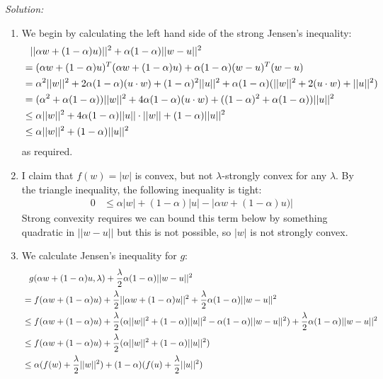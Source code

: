 \documentclass[
10pt, %
a4paper, %
oneside, %
headinclude,footinclude, %
BCOR5mm, %
]{scrartcl}
\newenvironment{solution}
               {\textit{Solution:}}
               {}
\begin{document}
\begin{solution}
  \begin{enumerate}[label=(\alph*)]
      \item We begin by calculating the left hand side of the strong Jensen's inequality:
        \begin{align*}
        &\hphantom{=} ||\alpha w + (1-\alpha)u)||^2 + \alpha(1-\alpha)||w-u||^2 \\
        &= (\alpha w + (1-\alpha)u)^T(\alpha w + (1-\alpha)u) + \alpha(1-\alpha)(w-u)^T(w-u) \\
        &= \alpha^2||w||^2 + 2\alpha(1-\alpha)(u\cdot w) + (1-\alpha)^2||u||^2 + \alpha(1-\alpha)(||w||^2 + 2(u\cdot w) + ||u||^2) \\
        &= (\alpha^2+\alpha(1-\alpha))||w||^2 + 4\alpha(1-\alpha)(u\cdot w) + ((1-\alpha)^2 + \alpha(1-\alpha))||u||^2 \\
        &\leq \alpha||w||^2 + 4\alpha(1-\alpha)||u||\cdot ||w|| + (1-\alpha)||u||^2 \\
        &\leq \alpha||w||^2 + (1-\alpha)||u||^2
        \end{align*}
        as required.
      \item I claim that $f(w)=|w|$ is convex, but not $\lambda$-strongly convex for any $\lambda$. By the triangle inequality, the following inequality is tight:
        \begin{align*}
          0 &\leq \alpha|w| + (1-\alpha)|u| -|\alpha w + (1-\alpha)u)|
        \end{align*}
        Strong convexity requires we can bound this term below by something quadratic in $||w-u||$ but this is not possible, so $|w|$ is not strongly convex.
      \item We calculate Jensen's inequality for $g$: \begin{align*}
        &\hphantom{=} g(\alpha w + (1-\alpha)u, \lambda) + \frac{\lambda}{2}\alpha(1-\alpha)||w-u||^2 \\
        &= f(\alpha w + (1-\alpha)u) + \frac{\lambda}{2}||\alpha w + (1-\alpha) u||^2 + \frac{\lambda}{2}\alpha(1-\alpha)||w-u||^2 \\
        &\leq f(\alpha w + (1-\alpha)u) + \frac{\lambda}{2}(\alpha||w||^2 + (1-\alpha)||u||^2 - \alpha(1-\alpha)||w-u||^2) + \frac{\lambda}{2}\alpha(1-\alpha)||w-u||^2 \\
        &\leq f(\alpha w + (1-\alpha)u) + \frac{\lambda}{2}(\alpha||w||^2 + (1-\alpha)||u||^2) \\
        &\leq \alpha (f(w) + \frac{\lambda}{2}||w||^2) + (1-\alpha)(f(u) + \frac{\lambda}{2}||u||^2)

\end{align*}
\end{enumerate}
\end{solution}
\end{document}
